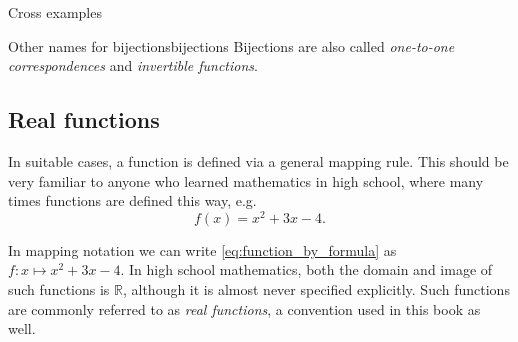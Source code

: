 \begin{example}{Cross examples}{}
\end{example}

\vspace{2em}
\begin{note}{Other names for bijections}{bijections}
	Bijections are also called \emph{one-to-one correspondences} and \emph{invertible functions}.
\end{note}

\subsection{Real functions}
In suitable cases, a function is defined via a general mapping rule. This should be very familiar to anyone who learned mathematics in high school, where many times functions are defined this way, e.g.
\begin{equation}
	f(x) = x^{2}+3x-4.
	\label{eq:function_by_formula}
\end{equation}

In mapping notation we can write \autoref{eq:function_by_formula} as $f:x\mapsto x^{2}+3x-4$. In high school mathematics, both the domain and image of such functions is $\mathbb{R}$, although it is almost never specified explicitly. Such functions are commonly referred to as \emph{real functions}, a convention used in this book as well.

